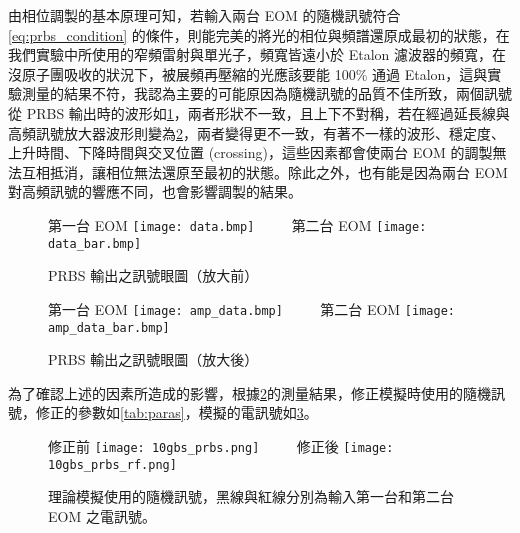 \documentclass[class=NCU_thesis, crop=false]{standalone}
\begin{document}
由相位調製的基本原理可知，若輸入兩台 EOM 的隨機訊號符合\cref{eq:prbs_condition} 的條件，則能完美的將光的相位與頻譜還原成最初的狀態，在我們實驗中所使用的窄頻雷射與單光子，頻寬皆遠小於 Etalon 濾波器的頻寬，在沒原子團吸收的狀況下，被展頻再壓縮的光應該要能 100\% 通過 Etalon，這與實驗測量的結果不符，我認為主要的可能原因為隨機訊號的品質不佳所致，兩個訊號從 PRBS 輸出時的波形如\cref{fig:prbs_eye_}，兩者形狀不一致，且上下不對稱，若在經過延長線與高頻訊號放大器波形則變為\cref{fig:amp_prbs_eye}，兩者變得更不一致，有著不一樣的波形、穩定度、上升時間、下降時間與交叉位置 (crossing)，這些因素都會使兩台 EOM 的調製無法互相抵消，讓相位無法還原至最初的狀態。除此之外，也有能是因為兩台 EOM 對高頻訊號的響應不同，也會影響調製的結果。

\begin{figure}[!hbt]
    \centering
    \subcaptionbox
        {第一台 EOM
        \label{fig:subfig_fig1}}
        {\texttt{[image: data.bmp]}}
    ~~~~
    \subcaptionbox
        {第二台 EOM
        \label{fig:subfig_fig2}}
        {\texttt{[image: data\_bar.bmp]}}
    \caption{PRBS 輸出之訊號眼圖（放大前）}
    \label{fig:prbs_eye_}
\end{figure}

\begin{figure}[!hbt]
    \centering
    \subcaptionbox
        {第一台 EOM
        \label{fig:subfig_fig1}}
        {\texttt{[image: amp\_data.bmp]}}
    ~~~~
    \subcaptionbox
        {第二台 EOM
        \label{fig:subfig_fig2}}
        {\texttt{[image: amp\_data\_bar.bmp]}}
    \caption{PRBS 輸出之訊號眼圖（放大後）}
    \label{fig:amp_prbs_eye}
\end{figure}

為了確認上述的因素所造成的影響，根據\cref{fig:amp_prbs_eye}的測量結果，修正模擬時使用的隨機訊號，修正的參數如\cref{tab:paras}，模擬的電訊號如\cref{fig:modify_or_not}。

\begin{figure}[!hbt]
    \centering
    \subcaptionbox
        {修正前
        \label{fig:subfig_fig1}}
        {\texttt{[image: 10gbs\_prbs.png]}}
    ~~~~
    \subcaptionbox
        {修正後
        \label{fig:subfig_fig2}}
        {\texttt{[image: 10gbs\_prbs\_rf.png]}}
    \caption[理論模擬使用的隨機訊號]{理論模擬使用的隨機訊號，黑線與紅線分別為輸入第一台和第二台 EOM 之電訊號。}
    \label{fig:modify_or_not}
\end{figure}
\end{document}
